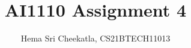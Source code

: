 \documentclass[journal,12pt,twocolumn]{IEEEtran}
\begin{document}
\makeatletter
{}
\makeatother
\let\StandardTheFigure\thefigure
\let\vec\mathbf
\renewcommand{\thefigure}{\theproblem}
\def\putbox#1#2#3{\makebox[0in][l]{\makebox[#1][l]{}\raisebox{\baselineskip}[0in][0in]{\raisebox{#2}[0in][0in]{#3}}}}
     \def\rightbox#1{\makebox[0in][r]{#1}}
     \def\centbox#1{\makebox[0in]{#1}}
     \def\topbox#1{\raisebox{-\baselineskip}[0in][0in]{#1}}
     \def\midbox#1{\raisebox{-0.5\baselineskip}[0in][0in]{#1}}
\vspace{3cm}
\title{AI1110 Assignment 4}
\author{ Hema Sri Cheekatla, CS21BTECH11013}	
\maketitle
\end{document}
